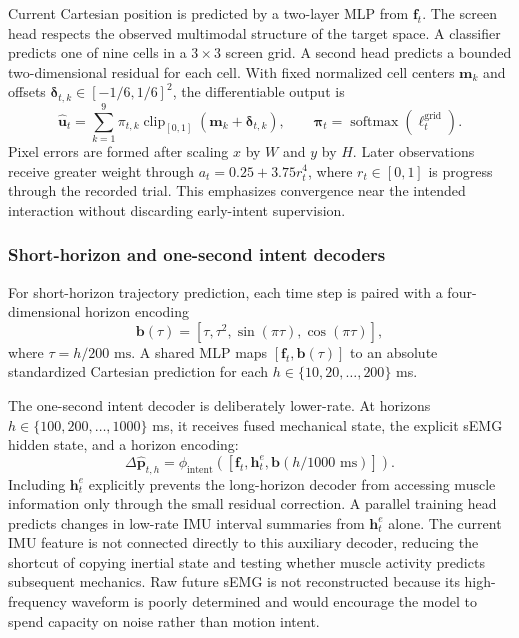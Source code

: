 Current Cartesian position is predicted by a two-layer MLP from
$\mathbf{f}_t$.  The screen head respects the observed multimodal structure of
the target space.  A classifier predicts one of nine cells in a $3\times3$
screen grid.  A second head predicts a bounded two-dimensional residual for
each cell.  With fixed normalized cell centers $\mathbf{m}_k$ and offsets
$\boldsymbol{\delta}_{t,k}\in[-1/6,1/6]^2$, the differentiable output is
\begin{equation}
 \hat{\mathbf{u}}_t = \sum_{k=1}^{9}
   \pi_{t,k}\operatorname{clip}_{[0,1]}
   (\mathbf{m}_k+\boldsymbol{\delta}_{t,k}),
 \qquad
 \boldsymbol{\pi}_t=\operatorname{softmax}(\boldsymbol{\ell}^{\mathrm{grid}}_t).
\end{equation}
Pixel errors are formed after scaling $x$ by $W$ and $y$ by $H$.  Later
observations receive greater weight through
$a_t=0.25+3.75r_t^4$, where $r_t\in[0,1]$ is progress through the recorded
trial.  This emphasizes convergence near the intended interaction without
discarding early-intent supervision.

\subsubsection{Short-horizon and one-second intent decoders}

For short-horizon trajectory prediction, each time step is paired with a
four-dimensional horizon encoding
\begin{equation}
 \mathbf{b}(\tau)=[\tau,\tau^2,\sin(\pi\tau),\cos(\pi\tau)],
\end{equation}
where $\tau=h/200\text{ ms}$.  A shared MLP maps
$[\mathbf{f}_t,\mathbf{b}(\tau)]$ to an absolute standardized Cartesian
prediction for each $h\in\{10,20,\ldots,200\}$ ms.

The one-second intent decoder is deliberately lower-rate.  At horizons
$h\in\{100,200,\ldots,1000\}$ ms, it receives fused mechanical state, the
explicit sEMG hidden state, and a horizon encoding:
\begin{equation}
 \Delta\hat{\mathbf{p}}_{t,h}
 = \phi_{\mathrm{intent}}([
      \mathbf{f}_t,\mathbf{h}^{e}_t,\mathbf{b}(h/1000\text{ ms})]).
\end{equation}
Including $\mathbf{h}^{e}_t$ explicitly prevents the long-horizon decoder from
accessing muscle information only through the small residual correction.  A
parallel training head predicts changes in low-rate IMU interval summaries
from $\mathbf{h}^{e}_t$ alone.  The current IMU feature is not connected
directly to this auxiliary decoder, reducing the shortcut of copying inertial
state and testing whether muscle activity predicts subsequent mechanics.
Raw future sEMG is not reconstructed because its high-frequency waveform is
poorly determined and would encourage the model to spend capacity on noise
rather than motion intent.

